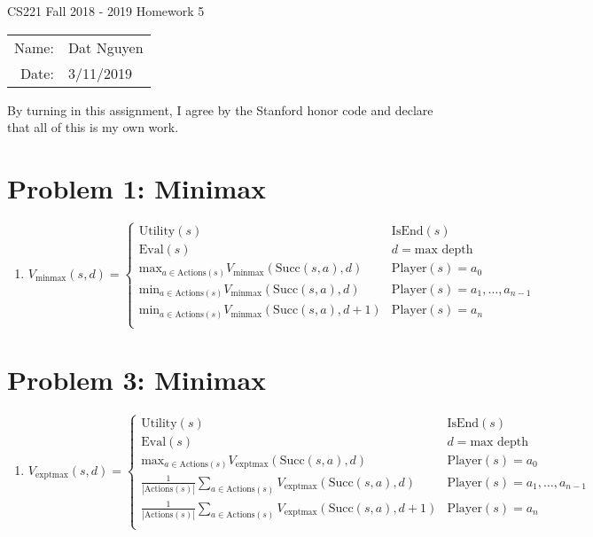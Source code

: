 \documentclass[12pt]{article}
\begin{document}
\begin{center}
{\Large CS221 Fall 2018 - 2019 Homework 5}

\begin{tabular}{rl}     
Name: & Dat Nguyen \\
Date: & 3/11/2019
\end{tabular}
\end{center}
 
 By turning in this assignment, I agree by the Stanford honor code and declare
that all of this is my own work.

\section*{Problem 1: Minimax}
\begin{enumerate}[label=(\alph*)]
	\item
	$V_{\text{minmax}}(s, d)=
	\begin{cases}
	\text{Utility}(s) &\text{IsEnd}(s)\\
	\text{Eval}(s) &d = \text{max depth}\\
	\text{max}_{a \in \text{Actions}(s)} V_{\text{minmax}}(\text{Succ}(s, a), d ) & \text{Player}(s) = a_0\\
	\text{min}_{a \in \text{Actions}(s)} V_{\text{minmax}}(\text{Succ}(s, a), d) & \text{Player}(s) = a_1, \dots, a_{n - 1} \\
	\text{min}_{a \in \text{Actions}(s)} V_{\text{minmax}}(\text{Succ}(s, a), d + 1) & \text{Player}(s) = a_{n} \\
	\end{cases}$
\end{enumerate}

\section*{Problem 3: Minimax}
\begin{enumerate}[label=(\alph*)]
	\item
	$V_{\text{exptmax}}(s, d)=
	\begin{cases}
	\text{Utility}(s) &\text{IsEnd}(s)\\
	\text{Eval}(s) &d = \text{max depth}\\
	\text{max}_{a \in \text{Actions}(s)} V_{\text{exptmax}}(\text{Succ}(s, a), d ) & \text{Player}(s) = a_0\\
	\frac{1}{|\text{Actions}(s)|} \sum_{a \in \text{Actions}(s)} V_{\text{exptmax}}(\text{Succ}(s, a), d) & \text{Player}(s) = a_1, \dots, a_{n - 1} \\
	\frac{1}{|\text{Actions}(s)|} \sum_{a \in \text{Actions}(s)} V_{\text{exptmax}}(\text{Succ}(s, a), d + 1) & \text{Player}(s) = a_{n} \\
	\end{cases}$
\end{enumerate}
\end{document}
